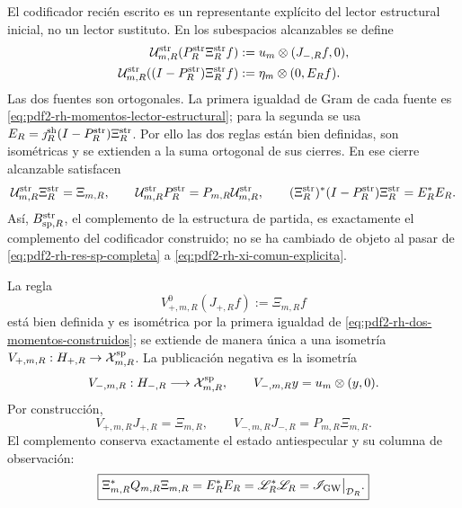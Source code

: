 El codificador recién escrito es un representante explícito del lector
estructural inicial, no un lector sustituto. En los subespacios alcanzables se
define
\begin{equation}\label{eq:pdf2-rh-isomorfismo-lector-estructural}
\begin{aligned}
 \mathcal U_{m,R}^{\rm str}
  (P_R^{\rm str}\Xi_R^{\rm str}f)
   &:=u_m\otimes(J_{-,R}f,0),\\
 \mathcal U_{m,R}^{\rm str}
  ((I-P_R^{\rm str})\Xi_R^{\rm str}f)
   &:=\eta_m\otimes(0,E_Rf).
\end{aligned}
\end{equation}
Las dos fuentes son ortogonales. La primera igualdad de Gram de cada fuente
es \eqref{eq:pdf2-rh-momentos-lector-estructural}; para la segunda se usa
\(E_R=\jmath_R^{\rm sh}(I-P_R^{\rm str})\Xi_R^{\rm str}\). Por ello las dos
reglas están bien definidas, son isométricas y se extienden a la suma ortogonal
de sus cierres. En ese cierre alcanzable satisfacen
\begin{equation}\label{eq:pdf2-rh-entrelazamiento-lector-estructural}
 \mathcal U_{m,R}^{\rm str}\Xi_R^{\rm str}=\Xi_{m,R},
 \qquad
 \mathcal U_{m,R}^{\rm str}P_R^{\rm str}
 =P_{m,R}\mathcal U_{m,R}^{\rm str},
 \qquad
 (\Xi_R^{\rm str})^*(I-P_R^{\rm str})\Xi_R^{\rm str}=E_R^*E_R.
\end{equation}
Así, \(B_{{\rm sp},R}^{\rm str}\), el complemento de la estructura de
partida, es exactamente el complemento del codificador construido; no se ha
cambiado de objeto al pasar de \eqref{eq:pdf2-rh-res-sp-completa} a
\eqref{eq:pdf2-rh-xi-comun-explicita}.

La regla
\begin{equation}\label{eq:pdf2-rh-vmas-rango}
 V_{+,m,R}^{0}(J_{+,R}f):=\Xi_{m,R}f
\end{equation}
está bien definida y es isométrica por la primera igualdad de
\eqref{eq:pdf2-rh-dos-momentos-construidos}; se extiende de manera única a
una isometría
\(V_{+,m,R}:H_{+,R}\to\mathcal X_{m,R}^{\rm sp}\). La publicación negativa
es la isometría
\begin{equation}\label{eq:pdf2-rh-vmenos}
 V_{-,m,R}:H_{-,R}\longrightarrow\mathcal X_{m,R}^{\rm sp},
 \qquad V_{-,m,R}y=u_m\otimes(y,0).
\end{equation}
Por construcción,
\begin{equation}\label{eq:pdf2-rh-doble-publicacion-material}
 \boxed{
 V_{+,m,R}J_{+,R}=\Xi_{m,R},
 \qquad
 V_{-,m,R}J_{-,R}=P_{m,R}\Xi_{m,R}.}
\end{equation}
El complemento conserva exactamente el estado antiespecular y su columna de
observación:
\begin{equation}\label{eq:pdf2-rh-complemento-comun}
 \boxed{
 \Xi_{m,R}^*Q_{m,R}\Xi_{m,R}
 =E_R^*E_R
 =\mathscr L_R^*\mathscr L_R
 =\mathscr I_{\rm GW}\big|_{\mathcal D_R}.}
\end{equation}

